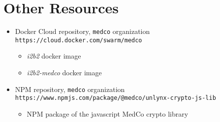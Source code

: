 \section{Other Resources}
\begin{itemize}
    \item Docker Cloud repository, \verb|medco| organization \\
    \verb|https://cloud.docker.com/swarm/medco|
    \begin{itemize}
        \item \emph{i2b2} docker image
        \item \emph{i2b2-medco} docker image
    \end{itemize}
    
    \item NPM repository, \verb|medco| organization \\
    \verb|https://www.npmjs.com/package/@medco/unlynx-crypto-js-lib|
    \begin{itemize}
        \item NPM package of the javascript MedCo crypto library
    \end{itemize}
    
\end{itemize}
